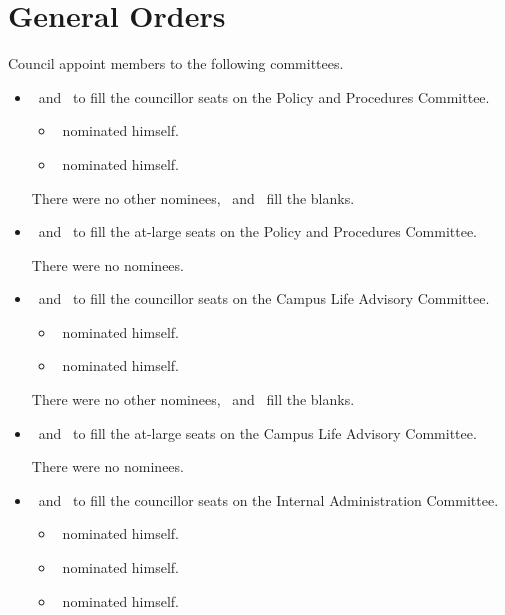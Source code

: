\documentclass[12pt, letterpaper]{article}
\begin{document}
\section*{General Orders}
\begin{motion}
    \birt Council appoint members to the following committees. 
    \movers{\brian}{\jill}
    
    \begin{itemize}
        \item \blank\ and \blank\ to fill the councillor seats on the Policy and 
            Procedures Committee.
            \begin{itemize}
                \item \tristan\ nominated himself.
                \item \seneca\ nominated himself.
            \end{itemize}

            There were no other nominees, \tristan\ and \seneca\ fill the 
            blanks.

        \item \blank\ and \blank\ to fill the at-large seats on the Policy and 
            Procedures Committee.

            There were no nominees. 

        \item \blank\ and \blank\ to fill the councillor seats on the Campus 
            Life Advisory Committee. 
            \begin{itemize}
                \item \tomson\ nominated himself.
                \item \alexander\ nominated himself.
            \end{itemize}

            There were no other nominees, \tomson\ and \alexander\ fill the
            blanks. 

        \item \blank\ and \blank\ to fill the at-large seats on the Campus 
            Life Advisory Committee. 

            There were no nominees. 

        \item \blank\ and \blank\ to fill the councillor seats on the Internal
            Administration Committee.
            \begin{itemize}
                \item \tomson\ nominated himself.
                \item \alexander\ nominated himself.
                \item \subham\ nominated himself. 
            \end{itemize}


\end{itemize}
\end{motion}
\end{document}
